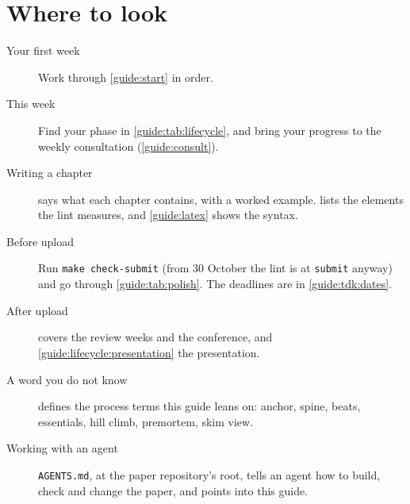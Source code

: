 \section{Where to look}\label{guide:here:route}
\begin{description}
  \item[Your first week] Work through \cref{guide:start} in order.
  \item[This week] Find your phase in \cref{guide:tab:lifecycle}, and bring your progress to the weekly consultation (\cref{guide:consult}).
  \item[Writing a chapter]  says what each chapter contains, with a worked example.  lists the elements the lint measures, and \cref{guide:latex} shows the syntax.
  \item[Before upload] Run \texttt{make check-submit} (from 30 October the lint is at \texttt{submit} anyway) and go through \cref{guide:tab:polish}. The deadlines are in \cref{guide:tdk:dates}.
  \item[After upload]  covers the review weeks and the conference, and \cref{guide:lifecycle:presentation} the presentation.
  \item[A word you do not know]  defines the process terms this guide leans on: anchor, spine, beats, essentials, hill climb, premortem, skim view.
  \item[Working with an agent] \texttt{AGENTS.md}, at the paper repository's root, tells an agent how to build, check and change the paper, and points into this guide.
\end{description}
